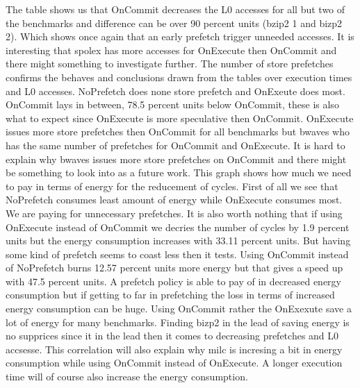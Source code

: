 The table shows us that OnCommit decreases the L0 accesses for all but two of the benchmarks and difference can be over 90 percent units (bzip2 1 and bizp2 2). Which shows once again that an early prefetch trigger unneeded accesses. It is interesting that spolex has more accesses for OnExecute then OnCommit and there might something to investigate further.  
\resSp
{}
The number of store prefetches confirms the behaves and conclusions drawn from the tables over execution times and L0 accesses. NoPrefetch does none store prefetch and OnExeute does most. OnCommit lays in between, 78.5 percent units below OnCommit, these is also what to expect since OnExecute is more speculative then OnCommit.  
OnExecute issues more store prefetches then OnCommit for all benchmarks but bwaves who has the same number of prefetches for OnCommit and OnExecute. It is hard to explain why bwaves issues more store prefetches on OnCommit and there might be something to look into as a future work. 
\resEnergy
{}
This graph shows how much we need to pay in terms of energy for the reducement of cycles. First of all we see that NoPrefetch consumes least amount of energy while OnExecute consumes most. We are paying for unnecessary prefetches. It is also worth nothing that if using OnExecute instead of OnCommit we decries the number of cycles by 1.9 percent units but the energy consumption increases with 33.11 percent units. But having some kind of prefetch seems to coast less then it tests. Using OnCommit instead of NoPrefetch burns 12.57 percent units more energy but that gives a speed up with 47.5 percent units. A prefetch policy is able to pay of in decreased energy consumption but if getting to far in prefetching the loss in terms of increased energy consumption can be huge.
Using OnCommit rather the OnExexute save a lot of energy for many benchmarks. Finding bizp2 in the lead of saving energy is no supprices since it in the lead then it comes to decreasing prefetches and L0 accsesse. This correlation will also explain why milc is incresing a bit in energy consumption while using OnCommit instead of OnExecute. A longer execution time will of course also increase the energy consumption.

